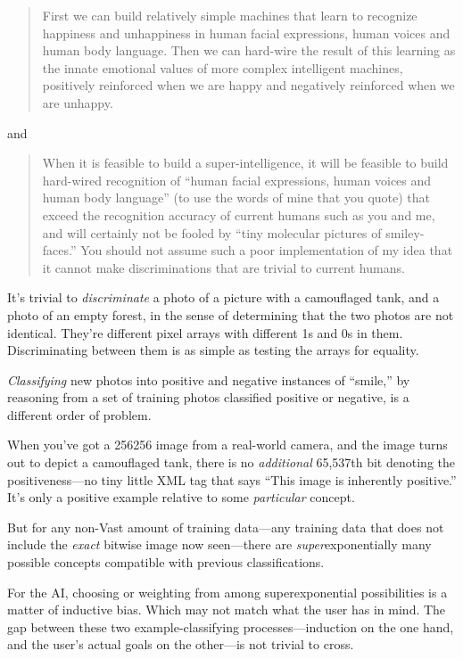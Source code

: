 \begin{quote}
{
 First we can build relatively simple machines that learn to
recognize happiness and unhappiness in human facial expressions, human
voices and human body language. Then we can hard-wire the result of
this learning as the innate emotional values of more complex
intelligent machines, positively reinforced when we are happy and
negatively reinforced when we are unhappy.}
\end{quote}

{
 and}

\begin{quote}
{
 When it is feasible to build a super-intelligence, it will be
feasible to build hard-wired recognition of ``human
facial expressions, human voices and human body
language'' (to use the words of mine that you quote)
that exceed the recognition accuracy of current humans such as you and
me, and will certainly not be fooled by ``tiny
molecular pictures of smiley-faces.'' You should not
assume such a poor implementation of my idea that it cannot make
discriminations that are trivial to current humans.}
\end{quote}

{
 It's trivial to \textit{discriminate} a photo of a
picture with a camouflaged tank, and a photo of an empty forest, in the
sense of determining that the two photos are not identical.
They're different pixel arrays with different 1s and 0s
in them. Discriminating between them is as simple as testing the arrays
for equality.}

{
 \textit{Classifying} new photos into positive and negative
instances of ``smile,'' by reasoning
from a set of training photos classified positive or negative, is a
different order of problem.}

{
 When you've got a 256{\texttimes}256 image from a
real-world camera, and the image turns out to depict a camouflaged
tank, there is no \textit{additional} 65,537th bit denoting the
positiveness---no tiny little XML tag that says ``This
image is inherently positive.'' It's
only a positive example relative to some \textit{particular} concept.}

{
 But for any non-Vast amount of training data---any training data
that does not include the \textit{exact} bitwise image now seen---there
are \textit{super}exponentially many possible concepts compatible with
previous classifications.}

{
 For the AI, choosing or weighting from among superexponential
possibilities is a matter of inductive bias. Which may not match what
the user has in mind. The gap between these two example-classifying
processes---induction on the one hand, and the user's
actual goals on the other---is not trivial to cross.}

